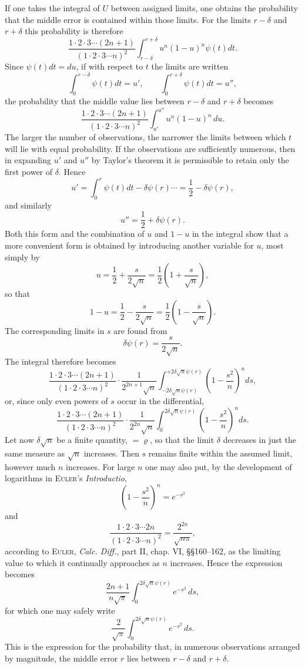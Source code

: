 \documentclass[11pt]{article}
\newcommand{\scn}[1]{\textsc{#1}}
\begin{document}
If one takes the integral of $U$ between assigned limits, one obtains the probability that the middle error is contained within those limits. For the limits $r-\delta$ and $r+\delta$ this probability is therefore
\[
 \frac{1\cdot2\cdot3\cdots(2n+1)}{(1\cdot2\cdot3\cdots n)^2}\int_{r-\delta}^{r+\delta}u^n(1-u)^n\psi(t)dt.
\]
Since $\psi(t)dt=du$, if with respect to $t$ the limits are written
\[
 \int_0^{r-\delta}\psi(t)dt=u',\qquad \int_0^{r+\delta}\psi(t)dt=u'',
\]
the probability that the middle value lies between $r-\delta$ and $r+\delta$ becomes
\[
 \frac{1\cdot2\cdot3\cdots(2n+1)}{(1\cdot2\cdot3\cdots n)^2}\int_{u'}^{u''}u^n(1-u)^n\,du.
\]
The larger the number of observations, the narrower the limits between which $t$ will lie with equal probability. If the observations are sufficiently numerous, then in expanding $u'$ and $u''$ by Taylor's theorem it is permissible to retain only the first power of $\delta$. Hence
\[
 u'=\int_0^r\psi(t)dt-\delta\psi(r)\cdots=\frac12-\delta\psi(r),
\]
and similarly
\[
 u''=\frac12+\delta\psi(r).
\]
Both this form and the combination of $u$ and $1-u$ in the integral show that a more convenient form is obtained by introducing another variable for $u$, most simply by
\[
 u=\frac12+\frac{s}{2\sqrt n}=\frac12\left(1+\frac{s}{\sqrt n}\right),
\]
so that
\[
 1-u=\frac12-\frac{s}{2\sqrt n}=\frac12\left(1-\frac{s}{\sqrt n}\right).
\]
The corresponding limits in $s$ are found from
\[
 \delta\psi(r)=\frac{s}{2\sqrt n}.
\]
The integral therefore becomes
\[
 \frac{1\cdot2\cdot3\cdots(2n+1)}{(1\cdot2\cdot3\cdots n)^2}\cdot\frac{1}{2^{2n+1}\sqrt n}\int_{-2\delta\sqrt n\psi(r)}^{+2\delta\sqrt n\psi(r)}\left(1-\frac{s^2}{n}\right)^n ds,
\]
or, since only even powers of $s$ occur in the differential,
\[
 \frac{1\cdot2\cdot3\cdots(2n+1)}{(1\cdot2\cdot3\cdots n)^2}\cdot\frac{1}{2^{2n}\sqrt n}\int_0^{2\delta\sqrt n\psi(r)}\left(1-\frac{s^2}{n}\right)^n ds.
\]
Let now $\delta\sqrt n$ be a finite quantity, $=\varrho$, so that the limit $\delta$ decreases in just the same measure as $\sqrt n$ increases. Then $s$ remains finite within the assumed limit, however much $n$ increases. For large $n$ one may also put, by the development of logarithms in \scn{Euler}'s \emph{Introductio},
\[
 \left(1-\frac{s^2}{n}\right)^n=e^{-s^2}
\]
and
\[
 \frac{1\cdot2\cdot3\cdots2n}{(1\cdot2\cdot3\cdots n)^2}=\frac{2^{2n}}{\sqrt{n\pi}},
\]
according to \scn{Euler}, \emph{Calc. Diff.}, part II, chap. VI, §§160--162, as the limiting value to which it continually approaches as $n$ increases. Hence the expression becomes
\[
 \frac{2n+1}{n\sqrt\pi}\int_0^{2\delta\sqrt n\psi(r)}e^{-s^2}\,ds,
\]
for which one may safely write
\[
 \frac2{\sqrt\pi}\int_0^{2\delta\sqrt n\psi(r)}e^{-s^2}\,ds.
\]
This is the expression for the probability that, in numerous observations arranged by magnitude, the middle error $r$ lies between $r-\delta$ and $r+\delta$.
\end{document}
